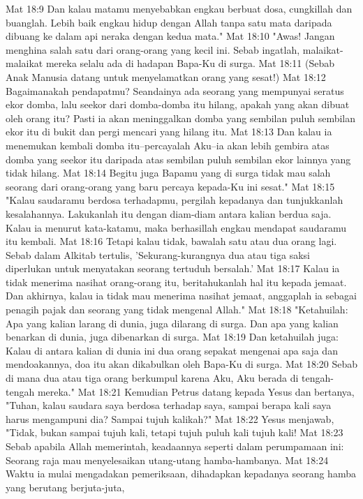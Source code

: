 Mat 18:9  Dan kalau matamu menyebabkan engkau berbuat dosa, cungkillah dan buanglah. Lebih baik engkau hidup dengan Allah tanpa satu mata daripada dibuang ke dalam api neraka dengan kedua mata."
Mat 18:10  "Awas! Jangan menghina salah satu dari orang-orang yang kecil ini. Sebab ingatlah, malaikat-malaikat mereka selalu ada di hadapan Bapa-Ku di surga.
Mat 18:11  (Sebab Anak Manusia datang untuk menyelamatkan orang yang sesat!)
Mat 18:12  Bagaimanakah pendapatmu? Seandainya ada seorang yang mempunyai seratus ekor domba, lalu seekor dari domba-domba itu hilang, apakah yang akan dibuat oleh orang itu? Pasti ia akan meninggalkan domba yang sembilan puluh sembilan ekor itu di bukit dan pergi mencari yang hilang itu.
Mat 18:13  Dan kalau ia menemukan kembali domba itu--percayalah Aku--ia akan lebih gembira atas domba yang seekor itu daripada atas sembilan puluh sembilan ekor lainnya yang tidak hilang.
Mat 18:14  Begitu juga Bapamu yang di surga tidak mau salah seorang dari orang-orang yang baru percaya kepada-Ku ini sesat."
Mat 18:15  "Kalau saudaramu berdosa terhadapmu, pergilah kepadanya dan tunjukkanlah kesalahannya. Lakukanlah itu dengan diam-diam antara kalian berdua saja. Kalau ia menurut kata-katamu, maka berhasillah engkau mendapat saudaramu itu kembali.
Mat 18:16  Tetapi kalau tidak, bawalah satu atau dua orang lagi. Sebab dalam Alkitab tertulis, 'Sekurang-kurangnya dua atau tiga saksi diperlukan untuk menyatakan seorang tertuduh bersalah.'
Mat 18:17  Kalau ia tidak menerima nasihat orang-orang itu, beritahukanlah hal itu kepada jemaat. Dan akhirnya, kalau ia tidak mau menerima nasihat jemaat, anggaplah ia sebagai penagih pajak dan seorang yang tidak mengenal Allah."
Mat 18:18  "Ketahuilah: Apa yang kalian larang di dunia, juga dilarang di surga. Dan apa yang kalian benarkan di dunia, juga dibenarkan di surga.
Mat 18:19  Dan ketahuilah juga: Kalau di antara kalian di dunia ini dua orang sepakat mengenai apa saja dan mendoakannya, doa itu akan dikabulkan oleh Bapa-Ku di surga.
Mat 18:20  Sebab di mana dua atau tiga orang berkumpul karena Aku, Aku berada di tengah-tengah mereka."
Mat 18:21  Kemudian Petrus datang kepada Yesus dan bertanya, "Tuhan, kalau saudara saya berdosa terhadap saya, sampai berapa kali saya harus mengampuni dia? Sampai tujuh kalikah?"
Mat 18:22  Yesus menjawab, "Tidak, bukan sampai tujuh kali, tetapi tujuh puluh kali tujuh kali!
Mat 18:23  Sebab apabila Allah memerintah, keadaannya seperti dalam perumpamaan ini: Seorang raja mau menyelesaikan utang-utang hamba-hambanya.
Mat 18:24  Waktu ia mulai mengadakan pemeriksaan, dihadapkan kepadanya seorang hamba yang berutang berjuta-juta,
